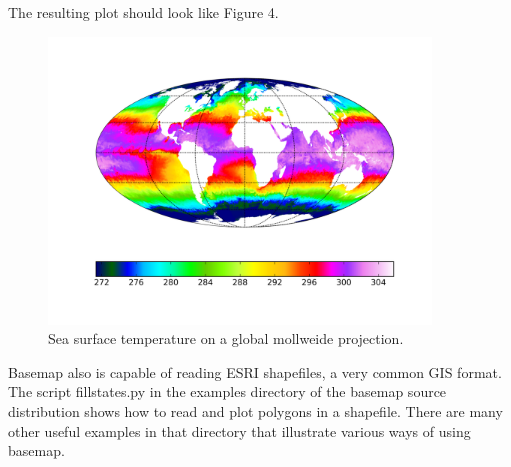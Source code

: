 The resulting plot should look like Figure 4.

\begin{figure}[h]
\includegraphics[width=4in]{fig/basemap5}

\caption{Sea surface temperature on a global mollweide projection.}

\end{figure}

\medskip{}

Basemap also is capable of reading ESRI shapefiles, a very common
GIS format. The script fillstates.py in the examples directory of
the basemap source distribution shows how to read and plot polygons
in a shapefile. There are many other useful examples in that directory
that illustrate various ways of using basemap.%
